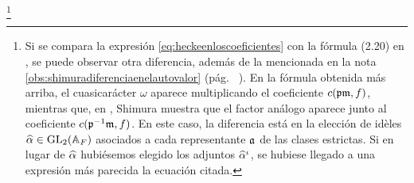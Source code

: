 \footnote{
	\label{obs:shimuradiferenciaenloscoeficientes}
	Si se compara la expresi\'{o}n \eqref{eq:heckeenloscoeficientes} con la
	f\'{o}rmula (2.20) en
	\cite{ShimuraSpecialValuesOfZeta}, se puede
	observar otra diferencia, adem\'{a}s de la mencionada en la nota
	\ref{obs:shimuradiferenciaenelautovalor} (p\'{a}g.~%
	\pageref{obs:shimuradiferenciaenelautovalor}). En la f\'{o}rmula
	obtenida m\'{a}s arriba, el cuasicar\'{a}cter $\omega$ aparece
	multiplicando el coeficiente $c(\frak{p}\frak{m},f)$, mientras que, en
	\cite{ShimuraSpecialValuesOfZeta}, Shimura muestra
	que el factor an\'{a}logo aparece junto al coeficiente
	$c(\frak{p}^{-1}\frak{m},f)$. En este caso, la diferencia est\'{a} en
	la elecci\'{o}n de id\`{e}les $\hhat{\alpha}\in\GL_{2}(\adeles{F})$
	asociados a cada representante $\frak{a}$ de las clases estrictas.
	Si en lugar de $\hhat{\alpha}$ hubi\'{e}semos elegido los adjuntos
	$\hhat{\alpha}^\iota$, se hubiese llegado a una expresi\'{o}n m\'{a}s
	parecida la ecuaci\'{o}n citada.
}
